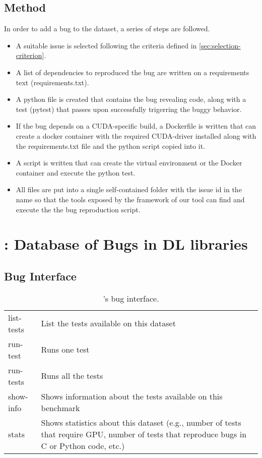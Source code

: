 \documentclass[sigconf,screen]{acmart}
\begin{document}

\subsection{Method}
\label{sec:method}


In order to add a bug to the dataset, a series of steps are followed.

\begin{itemize}
  \item A suitable issue is selected following the criteria defined in \ref{sec:selection-criterion}.
  \item A list of dependencies to reproduced the bug are written on a requirements text (requirements.txt).
  \item A python file is created that contains the bug revealing code, along with a test (pytest) that passes upon successfully trigerring the buggy behavior.
  \item If the bug depends on a CUDA-specific build, a Dockerfile is written that can create a docker container with the required CUDA-driver installed along with the requirements.txt file and the python script copied into it.
  \item A script is written that can create the virtual environment or the Docker container and execute the python test.
  \item All files are put into a single self-contained folder with the issue id in the name so that the tools exposed by the framework of our tool can find and execute the the bug reproduction script.
\end{itemize}


\section{\tname: Database of Bugs in DL libraries}
\subsection{Bug Interface}

\begin{table}
  \centering
  \caption{\label{table:bug-interface}\tname's bug interface.}
\begin{tabular}{lp{6.5cm}}
\toprule
list-tests & List the tests available on this dataset\\
run-test & Runs one test\\
run-tests & Runs all the tests\\
show-info & Shows information about the tests available on this benchmark\\
stats & Shows statistics about this dataset (e.g., number of tests
that require GPU, number of tests that reproduce bugs in C or Python
code, etc.)\\
\bottomrule
\end{tabular}
\end{table}
\end{document}
